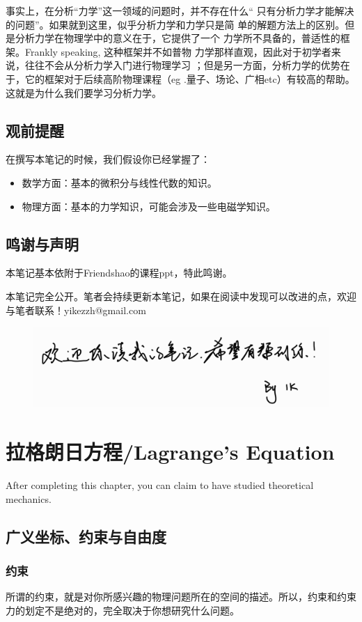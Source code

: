 \documentclass[a4paper, 10pt, openany]{book}%
\begin{document}
事实上，在分析“力学”这一领域的问题时，并不存在什么“
只有分析力学才能解决的问题”。如果就到这里，似乎分析力学和力学只是简
单的解题方法上的区别。但是分析力学在物理学中的意义在于，它提供了一个
力学所不具备的，普适性的框架。Frankly speaking, 这种框架并不如普物
力学那样直观，因此对于初学者来说，往往不会从分析力学入门进行物理学习
；但是另一方面，分析力学的优势在于，它的框架对于后续高阶物理课程（eg
.量子、场论、广相etc）有较高的帮助。这就是为什么我们要学习分析力学。
\section{观前提醒}
在撰写本笔记的时候，我们假设你已经掌握了：
\begin{itemize}

\item 数学方面：基本的微积分与线性代数的知识。

\item 物理方面：基本的力学知识，可能会涉及一些电磁学知识。

\end{itemize}
\section{鸣谢与声明}
本笔记基本依附于Friendshao的课程ppt，特此鸣谢。

本笔记完全公开。笔者会持续更新本笔记，如果在阅读中发现可以改进的点，欢迎
与笔者联系！yikezzh@gmail.com
\begin{figure}[ht]
  \centering 
  \includegraphics[width=14.5cm]{1.png}
  \end{figure}
\newpage
\chapter{拉格朗日方程/Lagrange's Equation}
After completing this chapter, you can claim to have studied theoretical mechanics.
\section{广义坐标、约束与自由度}
\subsection{约束}
所谓的约束，就是对你所感兴趣的物理问题所在的空间的描述。所以，约束和约束力的划定不是绝对的，完全取决于你想研究什么问题。
\end{document}
